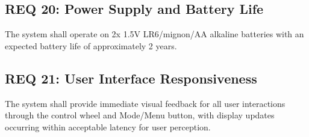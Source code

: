 \subsection*{REQ 20: Power Supply and Battery Life}
\label{subsec:REQ 20: Power Supply and Battery Life}
The system shall operate on 2x 1.5V LR6/mignon/AA alkaline batteries with an expected battery life of approximately 2 years.

\subsection*{REQ 21: User Interface Responsiveness}
\label{subsec:REQ 21: User Interface Responsiveness}
The system shall provide immediate visual feedback for all user interactions through the control wheel and Mode/Menu button, with display updates occurring within acceptable latency for user perception.
